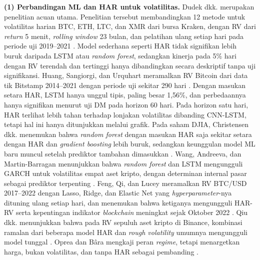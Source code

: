 \textbf{(1) Perbandingan ML dan HAR untuk volatilitas.} Dudek dkk. merupakan
penelitian acuan utama. Penelitian tersebut membandingkan 12 metode untuk
volatilitas harian BTC, ETH, LTC, dan XMR dari bursa Kraken, dengan RV dari
\textit{return} 5 menit, \textit{rolling window} 23 bulan, dan pelatihan ulang
setiap hari pada periode uji 2019--2021 \cite{dudek2024}. Model sederhana
seperti HAR tidak signifikan lebih buruk daripada LSTM atau \textit{random
forest}, sedangkan kinerja pada 5\% hari dengan RV terendah dan tertinggi hanya
dibandingkan secara deskriptif tanpa uji signifikansi. Huang, Sangiorgi, dan
Urquhart meramalkan RV Bitcoin dari data tik Bitstamp 2014--2021 dengan periode
uji sekitar 290 hari \cite{huang2024}. Dengan masukan setara HAR, LSTM hanya
unggul tipis, paling besar 1,56\%, dan perbedaannya hanya signifikan menurut uji
DM pada horizon 60 hari. Pada horizon satu hari, HAR terlihat lebih tahan
terhadap lonjakan volatilitas dibanding CNN-LSTM, tetapi hal ini hanya
ditunjukkan melalui grafik. Pada saham DJIA, Christensen dkk. menemukan bahwa
\textit{random forest} dengan masukan HAR saja sekitar setara dengan HAR dan
\textit{gradient boosting} lebih buruk, sedangkan keunggulan model ML baru
muncul setelah prediktor tambahan dimasukkan \cite{christensen2023}. Wang,
Andreeva, dan Martin-Barragan menunjukkan bahwa \textit{random forest} dan LSTM
mengungguli GARCH untuk volatilitas empat aset kripto, dengan determinan
internal pasar sebagai prediktor terpenting \cite{wang2023}. Feng, Qi, dan
Lucey meramalkan RV BTC/USD 2017--2022 dengan Lasso, Ridge, dan Elastic Net
yang \textit{hyperparameter}-nya dituning ulang setiap hari, dan menemukan
bahwa ketiganya mengungguli HAR-RV serta kepentingan indikator
\textit{blockchain} meningkat sejak Oktober 2022 \cite{feng2024ml}. Qiu dkk.
menunjukkan bahwa pada RV sepuluh aset kripto di Binance, kombinasi ramalan
dari beberapa model HAR dan \textit{rough volatility} umumnya mengungguli model
tunggal \cite{qiu2025}. Oprea dan Bâra mengkaji peran \textit{regime}, tetapi
menargetkan harga, bukan volatilitas, dan tanpa HAR sebagai pembanding
\cite{oprea2026}.

